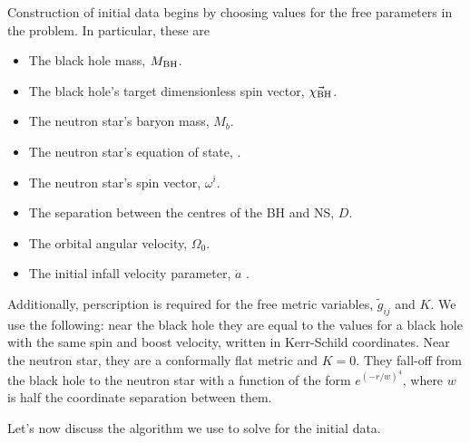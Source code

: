 Construction of initial data begins by choosing values for the free parameters in the problem. In particular, these are
\begin{itemize}
\item The black hole mass, $M_{\rm BH}$.
\item The black hole's target dimensionless spin vector, $\vec{\chi_{\rm BH}}$.
\item The neutron star's baryon mass, $M_{b}$.
\item The neutron star's equation of state, .
\item The neutron star's spin vector, $\omega^i$.
\item The separation between the centres of the BH and NS, $D$.
\item The orbital angular velocity, $\Omega_0$.
\item The initial infall velocity parameter, $\dot{a}$
.
\end{itemize}
Additionally, perscription is required for the free
metric variables, $\tilde{g}_{ij}$ and $K$. We use the following: near the black hole they
are equal to the values for a black hole with the same spin and boost
velocity,
written in Kerr-Schild coordinates. Near the neutron star, they are a
conformally flat metric and $K=0$. They fall-off from the black hole
to the neutron star with a function of the form $e^{(-r/w)^4}$, where
$w$ is half the coordinate separation between them.

Let's now discuss the algorithm we use to solve for the initial data. 

